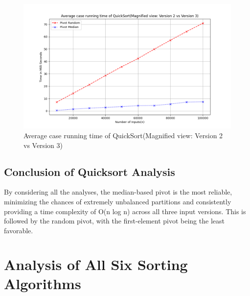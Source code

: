 \documentclass[a4paper,12pt]{report}
\begin{document}
\begin{figure}[H]
	\centering
	\includegraphics[width=1.1\textwidth]{./Average_case_QuickSort_Magnified_view.png}
	\caption{Average case running time of QuickSort(Magnified view: Version 2 vs Version 3)}
	\label{fig:Average case quicksort Magnified}
\end{figure}

\subsection{Conclusion of Quicksort Analysis}
By considering all the analyses, the median-based pivot is the most reliable, minimizing the chances of extremely unbalanced partitions and consistently providing a time complexity of O(n log n) across all three input versions. This is followed by the random pivot, with the first-element pivot being the least favorable.
 
\section{Analysis of All Six Sorting Algorithms}
\end{document}

